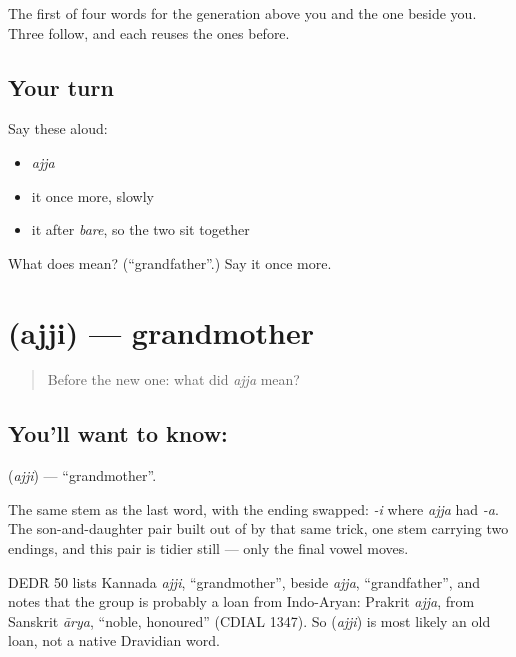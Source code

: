 \begin{grammarlens}[title={What you've built}]
The first of four words for the generation above you and the one beside you. Three follow, and each reuses the ones before.
\end{grammarlens}

\subsection*{Your turn}
Say these aloud:

\begin{itemize}
\raggedright
  \item \emph{ajja}
  \item it once more, slowly
  \item it after \emph{bare}, so the two sit together
\end{itemize}

\begin{tcolorbox}[breakable,colback=teal!4,colframe=teal!35!black,title={Before you move on}]
What does  mean? (\textquotedblleft{}grandfather\textquotedblright{}.) Say it once more.
\end{tcolorbox}
\section[\texorpdfstring{\kn{ಅಜ್ಜಿ} (ajji)}{ಅಜ್ಜಿ (ajji)}]{ (ajji) — grandmother}

\label{lesson:KA-C45-grandmother}



\begin{quote}
Before the new one: what did \emph{ajja} mean?
\end{quote}

\subsection*{You'll want to know: }
\textbf{} (\emph{ajji}) — \textquotedblleft{}grandmother\textquotedblright{}.

The same stem as the last word, with the ending swapped: \emph{-i} where \emph{ajja} had \emph{-a}. The son-and-daughter pair built  out of  by that same trick, one stem carrying two endings, and this pair is tidier still — only the final vowel moves.

\begin{cousinweb}
DEDR 50 lists Kannada \emph{ajji}, \textquotedblleft{}grandmother\textquotedblright{}, beside \emph{ajja}, \textquotedblleft{}grandfather\textquotedblright{}, and notes that the group is probably a loan from Indo-Aryan: Prakrit \emph{ajja}, from Sanskrit \emph{ārya}, \textquotedblleft{}noble, honoured\textquotedblright{} (CDIAL 1347). So \textbf{} (\emph{ajji}) is most likely an old loan, not a native Dravidian word.
\end{cousinweb}

